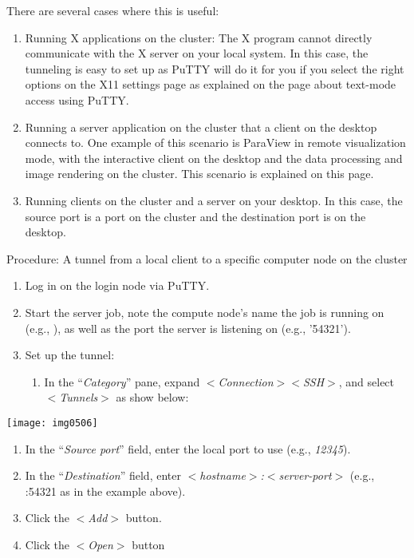 There are several cases where this is useful:

\begin{enumerate}
\item  Running X applications on the cluster: The X program cannot directly
  communicate with the X server on your local system. In this case, the
  tunneling is easy to set up as PuTTY will do it for you if you select the
  right options on the X11 settings page as explained on the page about
  text-mode access using PuTTY.
\item  Running a server application on the cluster that a client on the desktop
  connects to. One example of this scenario is ParaView in remote visualization
  mode, with the interactive client on the desktop and the data processing and
  image rendering on the cluster. This scenario is explained on this page.
\item  Running clients on the cluster and a server on your desktop. In this
  case, the source port is a port on the cluster and the destination port is on
  the desktop.
\end{enumerate}

Procedure: A tunnel from a local client to a specific computer node on the cluster

\begin{enumerate}
  \item  Log in on the login node via PuTTY.
  \item  Start the server job, note the compute node's name the job is running
  on (e.g., \computenode), as well as the port the server is listening on
(e.g., '54321').  \item  Set up the tunnel:

  \begin{enumerate}
    \item  In the ``\emph{Category}'' pane, expand $<$\emph{Connection}$>$$<$\emph{SSH}$>$, and select $<$\emph{Tunnels}$>$ as show below:
  \end{enumerate}
\end{enumerate}

\texttt{[image: img0506]}

\begin{enumerate}
  \item  In the ``\emph{Source port}'' field, enter the local port to use (e.g., \emph{12345}).
  \item  In the ``\emph{Destination}'' field, enter \emph{$<$hostname$>$:$<$server-port$>$} (e.g., \computenode:54321 as in the example above).
  \item  Click the $<$\emph{Add}$>$ button.
  \item  Click the $<$\emph{Open}$>$ button
\end{enumerate}

